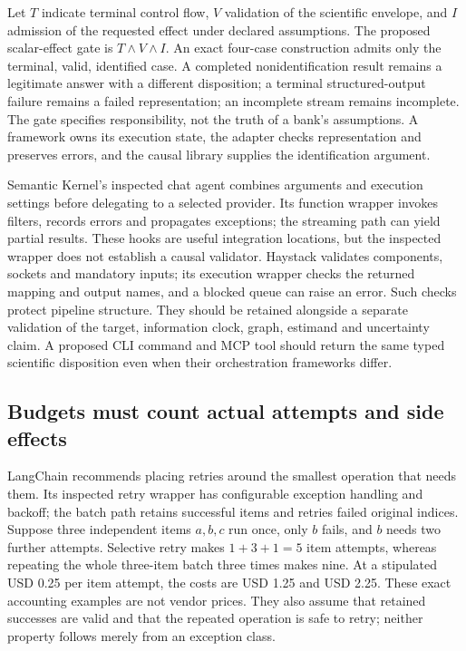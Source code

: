 Let \(T\) indicate terminal control flow, \(V\) validation of the scientific envelope, and \(I\)
admission of the requested effect under declared assumptions. The proposed scalar-effect gate is
\(T\land V\land I\). An exact four-case construction admits only the terminal, valid, identified
case. A completed nonidentification result remains a legitimate answer with a different disposition;
a terminal structured-output failure remains a failed representation; an incomplete stream remains
incomplete. The gate specifies responsibility, not the truth of a bank's assumptions. A framework
owns its execution state, the adapter checks representation and preserves errors, and the causal
library supplies the identification argument.~\citep{exec28_dl_reference}

Semantic Kernel's inspected chat agent combines arguments and execution settings before delegating
to a selected provider. Its function wrapper invokes filters, records errors and propagates
exceptions; the streaming path can yield partial results. These hooks are useful integration
locations, but the inspected wrapper does not establish a causal validator. Haystack validates
components, sockets and mandatory inputs; its execution wrapper checks the returned mapping and
output names, and a blocked queue can raise an error. Such checks protect pipeline structure.
They should be retained alongside a separate validation of the target, information clock, graph,
estimand and uncertainty claim. A proposed CLI command and MCP tool should return the same typed
scientific disposition even when their orchestration frameworks differ.
\citep{exec28_dl_semantic_kernel,exec28_dl_haystack}

\subsection{Budgets must count actual attempts and side effects}
LangChain recommends placing retries around the smallest operation that needs them. Its inspected
retry wrapper has configurable exception handling and backoff; the batch path retains successful
items and retries failed original indices. Suppose three independent items \(a,b,c\) run once,
only \(b\) fails, and \(b\) needs two further attempts. Selective retry makes \(1+3+1=5\) item
attempts, whereas repeating the whole three-item batch three times makes nine. At a stipulated
USD 0.25 per item attempt, the costs are USD 1.25 and USD 2.25. These exact accounting examples
are not vendor prices. They also assume that retained successes are valid and that the repeated
operation is safe to retry; neither property follows merely from an exception class.
\citep{exec28_dl_langchain,exec28_dl_reference}

